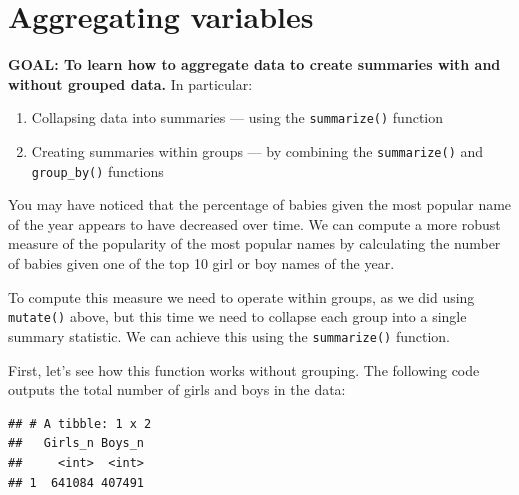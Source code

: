 \documentclass[]{book}
\newenvironment{Shaded}{\begin{snugshade}}{\end{snugshade}}
\newcommand{\CommentTok}[1]{\textcolor[rgb]{0.56,0.35,0.01}{\textit{#1}}}
\newcommand{\DataTypeTok}[1]{\textcolor[rgb]{0.13,0.29,0.53}{#1}}
\newcommand{\KeywordTok}[1]{\textcolor[rgb]{0.13,0.29,0.53}{\textbf{#1}}}
\newcommand{\NormalTok}[1]{#1}
\newcommand{\OperatorTok}[1]{\textcolor[rgb]{0.81,0.36,0.00}{\textbf{#1}}}
\newcommand{\StringTok}[1]{\textcolor[rgb]{0.31,0.60,0.02}{#1}}
\providecommand{\tightlist}{%
  \setlength{\itemsep}{0pt}\setlength{\parskip}{0pt}}
\begin{document}
\hypertarget{aggregating-variables}{%
\section{Aggregating variables}\label{aggregating-variables}}

\textbf{GOAL: To learn how to aggregate data to create summaries with and without grouped data.} In particular:

\begin{enumerate}
\def\labelenumi{\arabic{enumi}.}
\tightlist
\item
  Collapsing data into summaries --- using the \texttt{summarize()} function
\item
  Creating summaries within groups --- by combining the \texttt{summarize()} and \texttt{group\_by()} functions
\end{enumerate}

You may have noticed that the percentage of babies given the most
popular name of the year appears to have decreased over time. We can
compute a more robust measure of the popularity of the most popular
names by calculating the number of babies given one of the top 10 girl
or boy names of the year.

To compute this measure we need to operate within groups, as
we did using \texttt{mutate()} above, but this time we need to collapse each
group into a single summary statistic. We can achieve this using the
\texttt{summarize()} function.

First, let's see how this function works without grouping. The following
code outputs the total number of girls and boys in the data:

\begin{Shaded}
\end{Shaded}

\begin{verbatim}
## # A tibble: 1 x 2
##   Girls_n Boys_n
##     <int>  <int>
## 1  641084 407491
\end{verbatim}
\end{document}
